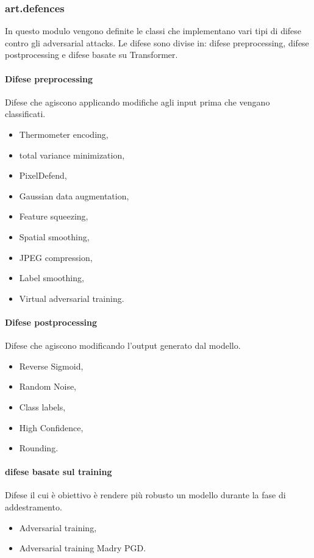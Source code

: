 \subsubsection{art.defences}
In questo modulo vengono definite le classi che implementano vari tipi di difese contro gli adversarial attacks. Le difese sono divise in: difese preprocessing, difese postprocessing
e difese basate su Transformer.

\paragraph{Difese preprocessing}
Difese che agiscono applicando modifiche agli input prima che vengano classificati.
     \begin{itemize}
        \item Thermometer encoding,
        \item total variance minimization,
        \item PixelDefend,
        \item Gaussian data augmentation,
        \item Feature squeezing,
        \item Spatial smoothing,
        \item JPEG compression,
        \item Label smoothing,
        \item Virtual adversarial training.
    \end{itemize}

\paragraph{Difese postprocessing}
Difese che agiscono modificando l'output generato dal modello.
\begin{itemize}
        \item Reverse Sigmoid,
        \item Random Noise,
        \item Class labels,
        \item High Confidence,
        \item Rounding.
    \end{itemize}
\paragraph{difese basate sul training}
Difese il cui è obiettivo è rendere più robusto un modello durante la fase di addestramento.
 \begin{itemize}
        \item Adversarial training,
        \item Adversarial training Madry PGD.
\end{itemize}
